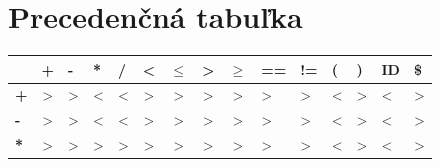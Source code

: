 \documentclass[a4paper, 11pt]{article}
\begin{document}
\section{Precedenčná tabuľka}
\begin{table}[!ht]
\centering
\begin{tabular}{|l|c|c|c|c|c|c|c|c|l|l|l|l|l|l|}
\hline
                        & \multicolumn{1}{l|}{\textbf{+}}              & \multicolumn{1}{l|}{\textbf{-}}              & \multicolumn{1}{l|}{\textbf{*}}              & \multicolumn{1}{l|}{\textbf{/}}              & \multicolumn{1}{l|}{\textbf{\textless{}}}    & \multicolumn{1}{l|}{\textbf{$\leq$}}         & \multicolumn{1}{l|}{\textbf{\textgreater{}}} & \multicolumn{1}{l|}{\textbf{$\geq$}}         & \textbf{==}             & \textbf{!=}             & \textbf{(}           & \textbf{)}              & \textbf{ID}          & \textbf{\$}             \\ \hline
\textbf{+}              & \textgreater{}                               & \textgreater{}                               & \textless{}                                  & \textless{}                                  & \textgreater{}                               & \textgreater{}                               & \textgreater{}                               & \textgreater{}                               & \textgreater{}          & \textgreater{}          & \textless{}          & \textgreater{}          & \textless{}          & \textgreater{}          \\ \hline
\textbf{-}              & \textgreater{}                               & \textgreater{}                               & \textless{}                                  & \textless{}                                  & \textgreater{}                               & \textgreater{}                               & \textgreater{}                               & \textgreater{}                               & \textgreater{}          & \textgreater{}          & \textless{}          & \textgreater{}          & \textless{}          & \textgreater{}          \\ \hline
\textbf{*}              & \textgreater{}                               & \textgreater{}                               & \textgreater{}                               & \textgreater{}                               & \textgreater{}                               & \textgreater{}                               & \textgreater{}                               & \textgreater{}                               & \textgreater{}          & \textgreater{}          & \textless{}          & \textgreater{}          & \textless{}          & \textgreater{}          \\ \hline

\end{tabular}
\end{table}
\end{document}
